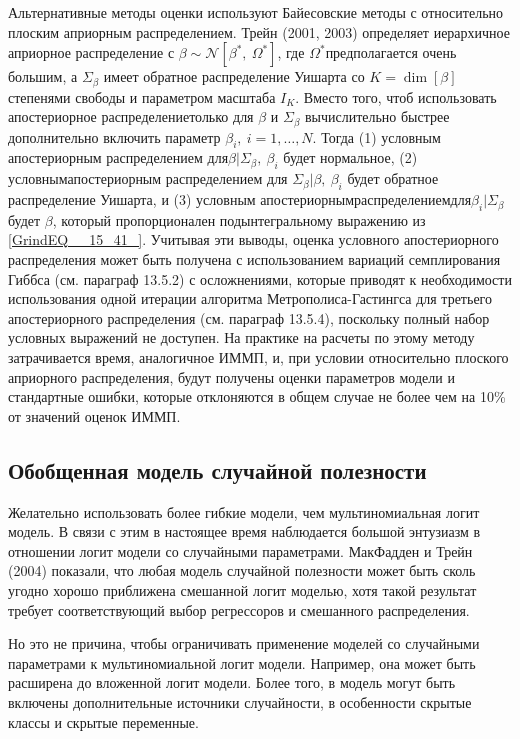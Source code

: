 Альтернативные методы оценки используют Байесовские методы с относительно плоским априорным распределением. Трейн (2001, 2003) определяет иерархичное априорное распределение с $\beta \sim {\mathcal N}[{\beta }^*,\ {\Omega }^*]$, где ${\Omega }^*$предполагается очень большим, а ${\Sigma }_{\beta }$ имеет обратное распределение Уишарта со $K={\dim  \left[\beta \right]\ }$ степенями свободы и параметром масштаба $I_K$. Вместо того, чтоб использовать апостериорное распределениетолько для $\beta $ и ${\Sigma }_{\beta }$ вычислительно быстрее дополнительно включить параметр ${\beta }_i,\ i=1,\dots ,N.$ Тогда (1) условным апостериорным распределением для$\beta |{\Sigma }_{\beta },\ {\beta }_i$ будет нормальное, (2) условнымапостериорным распределением для ${\Sigma }_{\beta }|\beta ,\ {\beta }_i$ будет обратное распределение Уишарта, и (3) условным апостериорнымраспределениемдля${\beta }_i|{\Sigma }_{\beta }$будет $\beta $, который пропорционален подынтегральному выражению из \eqref{GrindEQ__15_41_}. Учитывая эти выводы, оценка условного апостериорного распределения может быть получена с использованием вариаций семплирования Гиббса (см. параграф 13.5.2) с осложнениями, которые приводят к необходимости использования одной итерации алгоритма Метрополиса-Гастингса для третьего апостериорного распределения (см. параграф 13.5.4), поскольку полный набор условных выражений не доступен. На практике на расчеты по этому методу затрачивается время, аналогичное ИММП, и, при условии относительно плоского априорного распределения, будут получены оценки параметров модели и стандартные ошибки, которые отклоняются в общем случае не более чем на 10\% от значений оценок ИММП.

\subsection{Обобщенная модель случайной полезности}

Желательно использовать более гибкие модели, чем мультиномиальная логит модель. В связи с этим в настоящее время наблюдается большой энтузиазм в отношении логит модели со случайными параметрами. МакФадден и Трейн (2004) показали, что любая модель случайной полезности может быть сколь угодно хорошо приближена смешанной логит моделью, хотя такой результат требует соответствующий выбор регрессоров и смешанного распределения.

Но это не причина, чтобы ограничивать применение моделей со случайными параметрами к мультиномиальной логит модели. Например, она может быть расширена до вложенной логит модели. Более того, в модель могут быть включены дополнительные источники случайности, в особенности скрытые классы и скрытые переменные.

